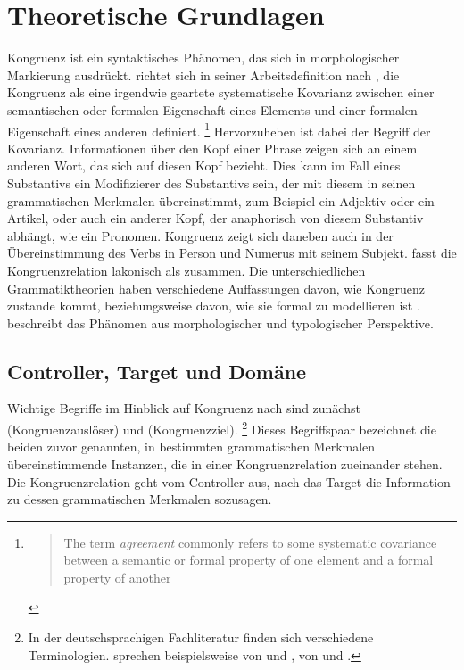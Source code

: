 \chapter{Theoretische Grundlagen}
\label{ch:theorie}

Kongruenz ist ein syntaktisches Phänomen, das sich in morphologischer
Markierung ausdrückt. \citet{corbett2006} richtet sich in seiner
Arbeitsdefinition nach \citet[610]{steele1978}, die Kongruenz als eine
irgendwie geartete systematische Kovarianz zwischen einer semantischen oder
formalen Eigenschaft eines Elements und einer formalen Eigenschaft eines
anderen definiert.%
%
	\footnote{\blockcquote[610]{steele1978}{The term \emph{agreement} commonly
		refers to some systematic covariance between a semantic or formal
		property of one element and a formal property of another}.%
	}
%
Hervorzuheben ist dabei der Begriff der Kovarianz. Informationen über den Kopf
einer Phrase zeigen sich an einem anderen Wort, das sich auf diesen Kopf
bezieht. Dies kann im Fall eines Substantivs ein Modifizierer des Substantivs
sein, der mit diesem in seinen grammatischen Merkmalen übereinstimmt, zum
Beispiel ein Adjektiv oder ein Artikel, oder auch ein
anderer Kopf, der anaphorisch von diesem Substantiv abhängt, wie ein Pronomen.
Kongruenz zeigt sich daneben auch in der Übereinstimmung des Verbs in Person
und Numerus mit seinem Subjekt. \citet[20]{corbett2006} fasst die
Kongruenzrelation lakonisch als  zusammen. Die unterschiedlichen Grammatiktheorien
haben verschiedene Auffassungen davon, wie Kongruenz zustande kommt,
beziehungsweise davon, wie sie formal zu modellieren ist
\autocite[siehe~z.\,B.][]{mueller2023}. \citeauthor{corbett2006} beschreibt das
Phänomen aus morphologischer und typologischer Perspektive.

\section{Controller, Target und Domäne}
\label{sec:ctrltarg}

Wichtige Begriffe im Hinblick auf Kongruenz nach \citet{corbett2006} sind
zunächst  (Kongruenzauslöser) und  (Kongruenzziel).%
%
	\footnote{In der deutschsprachigen Fachliteratur finden sich verschiedene
	Terminologien. \citet{fleischerschallert2011} sprechen beispielsweise von
	 und , \citet{panther2009} von
	 und .}
%
Dieses Begriffspaar bezeichnet die beiden zuvor genannten, in bestimmten
grammatischen Merkmalen übereinstimmende Instanzen, die in einer
Kongruenzrelation zueinander stehen. Die Kongruenzrelation geht vom Controller
aus, nach \citeauthor{corbett2006}  das Target die Information zu
dessen grammatischen Merkmalen sozusagen.

